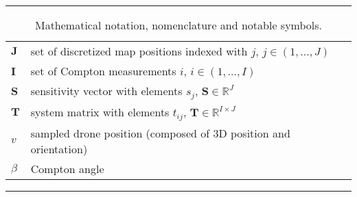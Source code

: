 \begin{table*}[!h]
  \scriptsize
  \centering
  \noindent\rule{\textwidth}{0.5pt}
  \begin{tabular}{lll}
    $\mathbf{J}$  & set of discretized map positions indexed with $j$, $j \in (1, \dots, J)$ \\
    $\mathbf{I}$  & set of Compton measurements $i$, $i \in (1, \dots, I)$ \\
    $\mathbf{S}$   &  sensitivity vector with elements $s_{j}$, $\mathbf{S} \in \mathbb{R}^{J}$ \\
    $\mathbf{T}$   & system matrix with elements $t_{ij}$, $\mathbf{T} \in \mathbb{R}^{I \times J}$ \\
    $v$            & sampled drone position (composed of 3D position and orientation) \\
    $\beta$       & Compton angle
  \end{tabular}
  \noindent\rule{\textwidth}{0.5pt}
  \caption{Mathematical notation, nomenclature and notable symbols.}
  \label{tab:mathematical_notation}
\end{table*}
